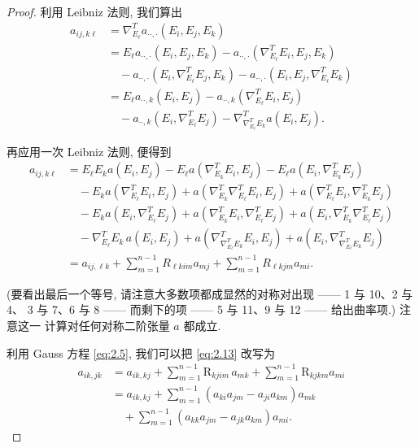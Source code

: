 \begin{proof}
利用 Leibniz 法则, 我们算出
\begin{equation}
\begin{aligned}
a_{ij,k\ell}&=\nabla^{T}_{E_\ell}a_{\cdot\cdot,\cdot}(E_i,E_j,E_k)\\
&=E_\ell a_{\cdot\cdot,\cdot}(E_i,E_j,E_k)
 -a_{\cdot\cdot,\cdot}(\nabla^{T}_{E_\ell}E_i,E_j,E_k)\\
&\quad -a_{\cdot\cdot,\cdot}(E_i,\nabla^{T}_{E_\ell}E_j,E_k)
 -a_{\cdot\cdot,\cdot}(E_i,E_j,\nabla^{T}_{E_\ell}E_k)\\
&=E_\ell a_{\cdot\cdot,k}(E_i,E_j)
 -a_{\cdot\cdot,k}(\nabla^{T}_{E_\ell}E_i,E_j)\\
\label{eq:2.12}
&\quad -a_{\cdot\cdot,k}(E_i,\nabla^{T}_{E_\ell}E_j)
 -\nabla^{T}_{\nabla^{T}_{E_\ell}E_k}a(E_i,E_j).
\end{aligned}
\end{equation}

再应用一次 Leibniz 法则, 便得到
\begin{equation}
\begin{aligned}
a_{ij,k\ell}
&=E_\ell E_ka(E_i,E_j)-E_\ell a(\nabla^{T}_{E_k}E_i,E_j)
 -E_\ell a(E_i,\nabla^{T}_{E_k}E_j)\\
&\quad -E_ka(\nabla^{T}_{E_\ell}E_i,E_j)
 +a(\nabla^{T}_{E_k}\nabla^{T}_{E_\ell}E_i,E_j)
 +a(\nabla^{T}_{E_\ell}E_i,\nabla^{T}_{E_k}E_j)\\
&\quad -E_ka(E_i,\nabla^{T}_{E_\ell}E_j)
 +a(\nabla^{T}_{E_k}E_i,\nabla^{T}_{E_\ell}E_j)
 +a(E_i,\nabla^{T}_{E_k}\nabla^{T}_{E_\ell}E_j)\\
&\quad -\nabla^{T}_{E_\ell}E_k\,a(E_i,E_j)
 +a(\nabla^{T}_{\nabla^{T}_{E_\ell}E_k}E_i,E_j)
 +a(E_i,\nabla^{T}_{\nabla^{T}_{E_\ell}E_k}E_j)\\
\label{eq:2.13}
&=a_{ij,\ell k}+\sum_{m=1}^{n-1}R_{\ell kim}a_{mj}
 +\sum_{m=1}^{n-1}R_{\ell kjm}a_{mi}.
\end{aligned}
\end{equation}

(要看出最后一个等号, 请注意大多数项都成显然的对称对出现 —— 1 与 10、2 与 4、
3 与 7、6 与 8 —— 而剩下的项 —— 5 与 11、9 与 12 —— 给出曲率项.) 注意这一
计算对任何对称二阶张量 $a$ 都成立.

利用 Gauss 方程 \eqref{eq:2.5}, 我们可以把 \eqref{eq:2.13} 改写为
\begin{equation}
\begin{aligned}
a_{ik,jk}&=a_{ik,kj}+\sum_{m=1}^{n-1}\mathrm{R}_{kjim}\,a_{mk}
 +\sum_{m=1}^{n-1}\mathrm{R}_{kjkm}a_{mi}\\
&=a_{ik,kj}+\sum_{m=1}^{n-1}(a_{ki}a_{jm}-a_{ji}a_{km})a_{mk}\\
&\quad +\sum_{m=1}^{n-1}(a_{kk}a_{jm}-a_{jk}a_{km})a_{mi}.
\end{aligned}
\label{eq:2.14}
\end{equation}


\end{proof}
